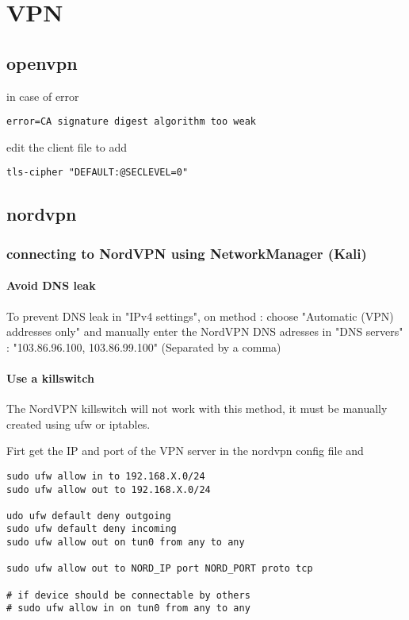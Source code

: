 \chapter{VPN}

\section{openvpn}

in case of error 
\begin{verbatim}
error=CA signature digest algorithm too weak
\end{verbatim}
edit the client file to add
\begin{verbatim}
tls-cipher "DEFAULT:@SECLEVEL=0"
\end{verbatim}

\section{nordvpn}


\subsection{connecting to NordVPN using NetworkManager (Kali)}

\subsubsection{Avoid DNS leak}

To prevent DNS leak  in "IPv4 settings",  on method : choose "Automatic (VPN)
addresses only" and manually enter the NordVPN DNS adresses in "DNS servers" :
"103.86.96.100, 103.86.99.100" (Separated by a comma)

\subsubsection{Use a killswitch}

The NordVPN killswitch will not work with this method, it must be manually
created using ufw or iptables.

Firt get the IP and port of the VPN server in the nordvpn config file and 

\begin{verbatim}
sudo ufw allow in to 192.168.X.0/24
sudo ufw allow out to 192.168.X.0/24

udo ufw default deny outgoing
sudo ufw default deny incoming
sudo ufw allow out on tun0 from any to any

sudo ufw allow out to NORD_IP port NORD_PORT proto tcp

# if device should be connectable by others
# sudo ufw allow in on tun0 from any to any
\end{verbatim}

